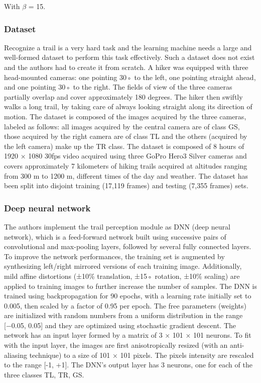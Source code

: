 With $\beta$ = 15\degree.

\subsubsection{Dataset}\label{header-n47}

Recognize a trail is a very hard task and the learning machine needs a
large and well-formed dataset to perform this task effectively. Such a
dataset does not exist and the authors had to create it from scratch. A
hiker was equipped with three head-mounted cameras: one pointing 30◦ to
the left, one pointing straight ahead, and one pointing 30◦ to the
right. The fields of view of the three cameras partially overlap and
cover approximately 180 degrees. The hiker then swiftly walks a long
trail, by taking care of always looking straight along its direction of
motion. The dataset is composed of the images acquired by the three
cameras, labeled as follows: all images acquired by the central camera
are of class GS, those acquired by the right camera are of class TL and
the others (acquired by the left camera) make up the TR class. The
dataset is composed of 8 hours of 1920 × 1080 30fps video acquired using
three GoPro Hero3 Silver cameras and covers approximately 7 kilometers
of hiking trails acquired at altitudes ranging from 300 m to 1200 m,
different times of the day and weather. The dataset has been split into
disjoint training (17,119 frames) and testing (7,355 frames) sets.

\subsubsection{Deep neural network}\label{header-n55}

The authors implement the trail perception module as DNN (deep neural
network), which is a feed-forward network built using successive pairs
of convolutional and max-pooling layers, followed by several fully
connected layers. To improve the network performances, the training set
is augmented by synthesizing left/right mirrored versions of each
training image. Additionally, mild affine distortions (±10\%
translation, ±15◦ rotation, ±10\% scaling) are applied to training
images to further increase the number of samples. The DNN is trained
using backpropagation for 90 epochs, with a learning rate initially set
to 0.005, then scaled by a factor of 0.95 per epoch. The free parameters
(weights) are initialized with random numbers from a uniform
distribution in the range {[}−0.05, 0.05{]} and they are optimized using
stochastic gradient descent. The network has an input layer formed by a
matrix of 3 × 101 × 101 neurons. To fit with the input layer, the images
are first anisotropically resized (with an anti-aliasing technique) to a
size of 101 × 101 pixels. The pixels intensity are rescaled to the range
{[}-1, +1{]}. The DNN's output layer has 3 neurons, one for each of the
three classes TL, TR, GS.


